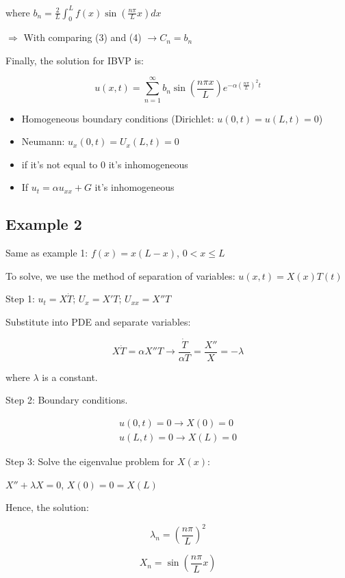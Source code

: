 \documentclass{article}
\begin{document}
where $b_n = \frac{2}{L} \int_0^L f(x) \sin \left( \frac{n \pi}{L} x \right) dx$

\hfill

$\Rightarrow$ With comparing (3) and (4) $\rightarrow C_n = b_n$

Finally, the solution for IBVP is:

$$u(x,t) = \sum_{n = 1}^\infty b_n \sin (\frac{n \pi x}{L}) e^{- \alpha \left( \frac{n \pi}{L} \right)^2 t}$$

\begin{itemize}
    \item Homogeneous boundary conditions (Dirichlet: $u(0,t) = u(L,t) = 0$)
    \item Neumann: $u_x(0,t) = U_x (L,t) = 0$
    \item if it's not equal to 0 it's inhomogeneous
    \item If $u_t = \alpha u_{xx} + G$ it's inhomogeneous
\end{itemize}

\subsection{Example 2}

Same as example 1: $f(x) = x(L - x)$, $0 < x \leq L$

To solve, we use the method of separation of variables: $u(x,t) = X(x) T(t)$

Step 1: $u_t = X \dot{T}$; $U_x = X' T$; $U_{xx} = X'' T$

Substitute into PDE and separate variables:

$$X \dot{T} = \alpha X'' T \longrightarrow \frac{\dot{T}}{\alpha T} = \frac{X''}{X} = -\lambda$$

where $\lambda$ is a constant. 

Step 2: Boundary conditions. 

$$\begin{matrix} u(0,t) = 0 \longrightarrow X(0) = 0 \\ u(L,t) = 0 \longrightarrow X(L) = 0 \end{matrix}$$

Step 3: Solve the eigenvalue problem for $X(x)$:

$X'' + \lambda X = 0$, $X(0) = 0 = X(L)$

Hence, the solution:

$$\lambda_n = \left( \frac{n \pi}{L} \right)^2$$

$$X_n = \sin(\frac{n \pi}{L} x)$$
\end{document}
